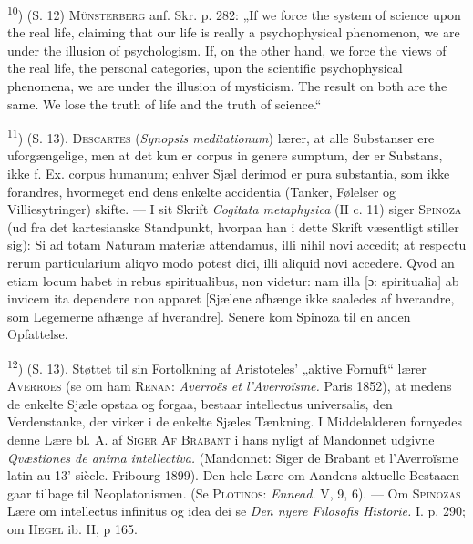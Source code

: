 \documentclass[12pt,a4paper,openany]{book}
\newcommand{\opage}[1]{\marginnote{\footnotesize\textit{[#1]}}}
\begin{document}
\begin{small}
\textsuperscript{10}) (S. 12) \textsc{Münsterberg} anf. Skr. p. 282: „If we
force the system of science upon the real life, claiming that our life is
really a psychophysical
\opage{86}phenomenon, we are under the illusion of psychologism. If, on the
other hand, we force the views of the real life, the personal categories, upon
the scientific psychophysical phenomena, we are under the illusion of
mysticism. The result on both are the same. We lose the truth of life and the
truth of science.“

\textsuperscript{11}) (S. 13). \textsc{Descartes} (\textit{Synopsis
meditationum}) lærer, at alle Substanser ere uforgængelige, men at det kun er
corpus in genere sumptum, der er Substans, ikke f. Ex. corpus humanum; enhver
Sjæl derimod er pura substantia, som ikke forandres, hvormeget end dens enkelte
accidentia (Tanker, Følelser og Villiesytringer) skifte. --- I sit Skrift
\textit{Cogitata metaphysica} (II c. 11) siger \textsc{Spinoza} (ud fra det
kartesianske Standpunkt, hvorpaa han i dette Skrift væsentligt stiller sig): Si
ad totam Naturam materiæ attendamus, illi nihil novi accedit; at respectu rerum
particularium aliqvo modo potest dici, illi aliquid novi accedere. Qvod an
etiam locum habet in rebus spiritualibus, non videtur: nam illa [ɔ:
spiritualia] ab invicem ita dependere non apparet [Sjælene afhænge ikke
saaledes af hverandre, som Legemerne afhænge af hverandre]. Senere kom Spinoza
til en anden Opfattelse.

\textsuperscript{12}) (S. 13). Støttet til sin Fortolkning af Aristoteles'
„aktive Fornuft“ lærer \textsc{Averroes} (se om ham \textsc{Renan}:
\textit{Averroës et l'Averroïsme.} Paris 1852), at medens de enkelte Sjæle
opstaa og forgaa, bestaar intellectus universalis, den Verdenstanke, der virker
i de enkelte Sjæles Tænkning. I Middelalderen fornyedes denne Lære bl. A. af
\textsc{Siger Af Brabant} i hans nyligt af Mandonnet udgivne \textit{Qvæstiones
de anima intellectiva.} (Mandonnet: Siger de Brabant et l'Averroïsme latin au
13' siècle. Fribourg 1899). Den hele Lære om Aandens aktuelle Bestaaen gaar
tilbage til Neoplatonismen. (Se \textsc{Plotinos}: \textit{Ennead.} V, 9, 6).
--- Om \textsc{Spinozas} Lære om intellectus infinitus og idea dei se
\textit{Den nyere Filosofis Historie.} I. p. 290; om \textsc{Hegel} ib. II, p 165.


\end{small}
\end{document}

